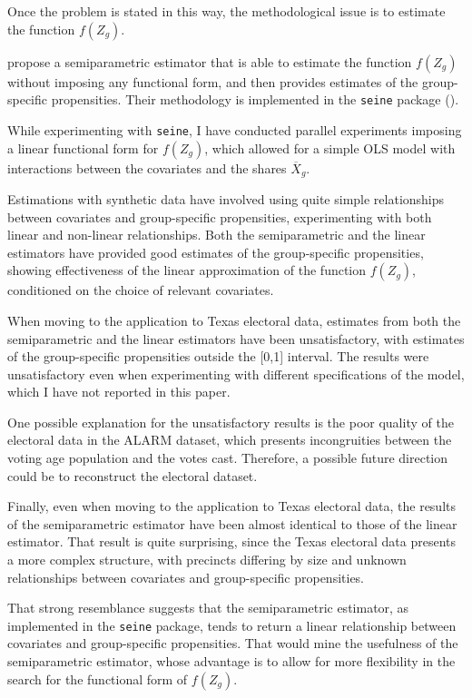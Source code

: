 Once the problem is stated in this way, the methodological issue is to estimate the function $f(Z_g)$.

\citet{mccartan2025identificationsemiparametricestimationconditional} propose a semiparametric estimator that is able to estimate the function $f(Z_g)$ without imposing any functional form, and then provides estimates of the group-specific propensities. Their methodology is implemented in the \texttt{seine} package (\citet{seine}).

While experimenting with \texttt{seine}, I have conducted parallel experiments imposing a linear functional form for $f(Z_g)$, which allowed for a simple OLS model with interactions between the covariates and the shares $\overline{X}_g$.

Estimations with synthetic data have involved using quite simple relationships between covariates and group-specific propensities, experimenting with both linear and non-linear relationships.
Both the semiparametric and the linear estimators have provided good estimates of the group-specific propensities, showing effectiveness of the linear approximation of the function $f(Z_g)$, conditioned on the choice of relevant covariates.

When moving to the application to Texas electoral data, estimates from both the semiparametric and the linear estimators have been unsatisfactory, with estimates of the group-specific propensities outside the [0,1] interval. The results were unsatisfactory even when experimenting with different specifications of the model, which I have not reported in this paper.

One possible explanation for the unsatisfactory results is the poor quality of the electoral data in the ALARM dataset, which presents incongruities between the voting age population and the votes cast.
Therefore, a possible future direction could be to reconstruct the electoral dataset.

Finally, even when moving to the application to Texas electoral data, the results of the semiparametric estimator have been almost identical to those of the linear estimator. That result is quite surprising, since the Texas electoral data presents a more complex structure, with precincts differing by size and unknown relationships between covariates and group-specific propensities.

That strong resemblance suggests that the semiparametric estimator, as implemented in the \texttt{seine} package, tends to return a linear relationship between covariates and group-specific propensities.
That would mine the usefulness of the semiparametric estimator, whose advantage is to allow for more flexibility in the search for the functional form of $f(Z_g)$.

